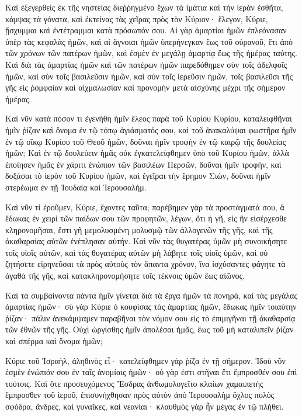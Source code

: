{\par }{\PP {}Καὶ ἐξεγερθεὶς ἐκ τῆς νηστείας διεῤῥηγμένα ἔχων τὰ ἱμάτια καὶ τὴν ἱερὰν ἐσθῆτα, κάμψας τὰ γόνατα, καὶ ἐκτείνας τὰς χεῖρας πρὸς τὸν Κύριον·
ἔλεγον, Κύριε, ᾔσχυμμαι καὶ ἐντέτραμμαι κατὰ πρόσωπόν σου.
Αἱ γὰρ ἁμαρτίαι ἡμῶν ἐπλεόνασαν ὑπὲρ τὰς κεφαλὰς ἡμῶν, καὶ αἱ ἄγνοιαι ἡμῶν ὑπερήνεγκαν ἕως τοῦ οὐρανοῦ,
ἔτι ἀπὸ τῶν χρόνων τῶν πατέρων ἡμῶν, καὶ ἐσμὲν ἐν μεγάλῃ ἁμαρτίᾳ ἕως τῆς ἡμέρας ταύτης.
Καὶ διὰ τὰς ἁμαρτίας ἡμῶν καὶ τῶν πατέρων ἡμῶν παρεδόθημεν σὺν τοῖς ἀδελφοῖς ἡμῶν, καὶ σὺν τοῖς βασιλεῦσιν ἡμῶν, καὶ σὺν τοῖς ἱερεῦσιν ἡμῶν, τοῖς βασιλεῦσι τῆς γῆς εἰς ῥομφαίαν καὶ αἰχμαλωσίαν καὶ προνομὴν μετὰ αἰσχύνης μέχρι τῆς σήμερον ἡμέρας.
\par }{\PP {}Καὶ νῦν κατὰ πόσον τι ἐγενήθη ἡμῖν ἔλεος παρὰ τοῦ Κυρίου Κυρίου, καταλειφθῆναι ἡμῖν ῥίζαν καὶ ὄνομα ἐν τῷ τόπῳ ἁγιάσματός σου,
καὶ τοῦ ἀνακαλύψαι φωστῆρα ἡμῖν ἐν τῷ οἴκῳ Κυρίου τοῦ Θεοῦ ἡμῶν, δοῦναι ἡμῖν τροφὴν ἐν τῷ καιρῷ τῆς δουλείας ἡμῶν;
Καὶ ἐν τῷ δουλεύειν ἡμᾶς οὐκ ἐγκατελείφθημεν ὑπὸ τοῦ Κυρίου ἡμῶν, ἀλλὰ ἐποίησεν ἡμᾶς ἐν χάριτι ἐνώπιον τῶν βασιλέων Περσῶν,
δοῦναι ἡμῖν τροφὴν, καὶ δοξάσαι τὸ ἱερὸν τοῦ Κυρίου ἡμῶν, καὶ ἐγεῖραι τὴν ἔρημον Σιὼν, δοῦναι ἡμῖν στερέωμα ἐν τῇ Ἰουδαίᾳ καὶ Ἱερουσαλήμ.
\par }{\PP {}Καὶ νῦν τί ἐροῦμεν, Κύριε, ἔχοντες ταῦτα; παρέβημεν γὰρ τὰ προστάγματά σου, ἃ ἔδωκας ἐν χειρὶ τῶν παίδων σου τῶν προφητῶν,
λέγων, ὅτι ἡ γῆ, εἰς ἣν εἰσέρχεσθε κληρονομῆσαι, ἔστι γῆ μεμολυσμένη μολυσμῷ τῶν ἀλλογενῶν τῆς γῆς, καὶ τῆς ἀκαθαρσίας αὐτῶν ἐνέπλησαν αὐτήν.
Καὶ νῦν τὰς θυγατέρας ὑμῶν μὴ συνοικήσητε τοῖς υἱοῖς αὐτῶν, καὶ τὰς θυγατέρας αὐτῶν μὴ λάβητε τοῖς υἱοῖς ὑμῶν,
καὶ οὐ ζητήσετε εἰρηνεῦσαι τὰ πρὸς αὐτοὺς τὸν ἅπαντα χρόνον, ἵνα ἰσχύσαντες φάγητε τὰ ἀγαθὰ τῆς γῆς, καὶ κατακληρονομήσητε τοῖς τέκνοις ὑμῶν ἕως αἰῶνος.
\par }{\PP {}Καὶ τὰ συμβαίνοντα πάντα ἡμῖν γίνεται διὰ τὰ ἔργα ἡμῶν τὰ πονηρὰ, καὶ τὰς μεγάλας ἁμαρτίας ἡμῶν·
σὺ γὰρ Κύριε ὁ κουφίσας τὰς ἁμαρτίας ἡμῶν, ἔδωκας ἡμῖν τοιαύτην ῥίζαν· πάλιν ἀνεκάμψαμεν παραβῆναι τὸν νόμον σου εἰς τὸ ἐπιμιγῆναι τῇ ἀκαθαρσίᾳ τῶν ἐθνῶν τῆς γῆς.
Οὐχὶ ὠργίσθης ἡμῖν ἀπολέσαι ἡμᾶς, ἕως τοῦ μὴ καταλιπεῖν ῥίζαν καὶ σπέρμα καὶ ὄνομα ἡμῶν;
\par }{\PP {}Κύριε τοῦ Ἰσραὴλ, ἀληθινὸς εἶ· κατελείφθημεν γὰρ ῥίζα ἐν τῇ σήμερον.
Ἰδοὺ νῦν ἐσμὲν ἐνώπιόν σου ἐν ταῖς ἀνομίαις ἡμῶν· οὐ γὰρ ἐστι στῆναι ἔτι ἔμπροσθέν σου ἐπὶ τούτοις.
Καὶ ὅτε προσευχόμενος Ἔσδρας ἀνθωμολογεῖτο κλαίων χαμαιπετὴς ἔμπροσθεν τοῦ ἱεροῦ, ἐπισυνήχθησαν πρὸς αὐτὸν ἀπὸ Ἱερουσαλὴμ ὄχλος πολὺς σφόδρα, ἄνδρες, καὶ γυναῖκες, καὶ νεανίαι· κλαυθμὸς γὰρ ἦν μέγας ἐν τῷ πλήθει.
}
